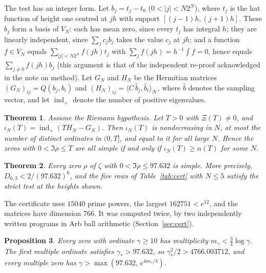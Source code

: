 \documentclass[11pt,a4paper]{article}
\theoremstyle{plain}
\newtheorem{theorem}{Theorem}
\newtheorem{proposition}[theorem]{Proposition}
\theoremstyle{remark}
\DeclareMathOperator{\ind}{ind}
\newcommand{\Hs}{\mathcal H}
\begin{document}
The test has an integer form. Let $b_j=t_j-t_0$ ($0<|j|<N2^N$), where $t_j$ is the hat function of height one centred
at $jh$ with support $[(j-1)h,(j+1)h]$. These $b_j$ form a basis of $V_N$: each has mean zero, since every $t_j$
has integral $h$; they are linearly independent, since $\sum_jc_jb_j$ takes the value $c_j$ at $jh$; and a function
$f\in V_N$ equals $\sum_{|j|<N2^N}f(jh)t_j$ with $\sum_jf(jh)=h^{-1}\int f=0$, hence equals $\sum_{j\ne0}f(jh)b_j$
(this argument is that of the independent re-proof acknowledged in the note on method). Let $G_N$ and $H_N$ be the Hermitian
matrices $(G_N)_{ij}=Q(b_j,b_i)$ and $(H_N)_{ij}=\langle C\,\widehat b_j,\widehat b_i\rangle_{\Hs}$, where
$\widehat b$ denotes the sampling vector, and let $\ind_+$ denote the number of positive eigenvalues.

\begin{theorem}\label{thm:integer}
Assume the Riemann hypothesis. Let $T>0$ with $\Xi(T)\ne0$, and $\iota_N(T)=\ind_+(TH_N-G_N)$. Then $\iota_N(T)$ is
nondecreasing in $N$, at most the number of distinct ordinates in $(0,T]$, and equal to it for all large $N$. Hence
the zeros with $0<\Im\rho\le T$ are all simple if and only if $\iota_N(T)\ge n(T)$ for some $N$.
\end{theorem}

\begin{theorem}\label{thm:cert}
Every zero $\rho$ of $\zeta$ with $0<\Im\rho\le 97.632$ is simple. More precisely, $D_{6,3}<2/(97.632)^6$, and the
five rows of Table~\ref{tab:cert} with $N\le5$ satisfy the strict test at the heights shown.
\end{theorem}

The certificate uses $15040$ prime powers, the largest $162751<e^{12}$, and the matrices have dimension $766$. It
was computed twice, by two independently written programs in Arb ball arithmetic (Section~\ref{sec:cert}).

\begin{proposition}\label{prop:const}
Every zero with ordinate $\gamma\ge10$ has multiplicity $m_\gamma<\frac34\log\gamma$. The first multiple ordinate
satisfies $\gamma_*>97.632$, so $\gamma_*^2/2>4766.003712$, and every multiple zero has
$\gamma>\max(97.632,\,e^{4m_\gamma/3})$.
\end{proposition}
\end{document}
